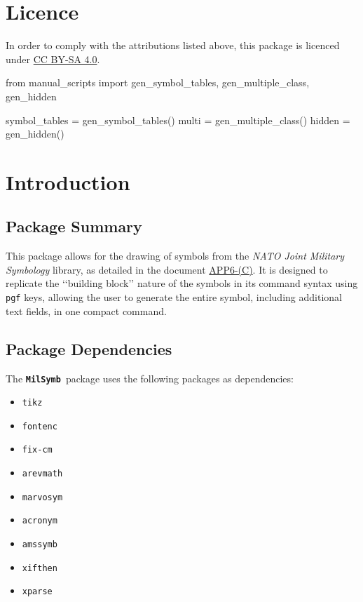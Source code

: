 \documentclass[a4paper, titlepage]{article}
\newcommand\MilSymb{\textbf{\texttt{MilSymb}}}
\newcommand\DocLink{\href{https://www.awl.edu.pl/images/en/APP_6_C.pdf}{APP6-(C)}}
\begin{document}
\section*{Licence}
In order to comply with the attributions listed above, this package is licenced under \href{https://creativecommons.org/licenses/by-sa/4.0/}{CC BY-SA 4.0}.

\clearpage

\tableofcontents

\clearpage

\begin{pycode}
  from manual_scripts import gen_symbol_tables, gen_multiple_class, gen_hidden

  symbol_tables = gen_symbol_tables()
  multi = gen_multiple_class()
  hidden = gen_hidden()

\end{pycode}

\section{Introduction}

\subsection{Package Summary}

This package allows for the drawing of symbols from the \textit{NATO Joint Military Symbology} library, as detailed in the document \DocLink. It is designed to replicate the \lq\lq{}building block\rq\rq{} nature of the symbols in its command syntax using \texttt{pgf} keys, allowing the user to generate the entire symbol, including additional text fields, in one compact command.

\subsection{Package Dependencies}

The \MilSymb\  package uses the following packages as dependencies:

\begin{itemize}
\item \texttt{tikz}
\item \texttt{fontenc}
\item \texttt{fix-cm}
\item \texttt{arevmath}
\item \texttt{marvosym}
\item \texttt{acronym}
\item \texttt{amssymb}
\item \texttt{xifthen}
\item \texttt{xparse}
\end{itemize}
\end{document}
